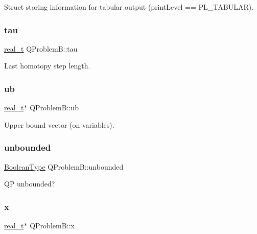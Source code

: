 Struct storing information for tabular output (print\+Level == P\+L\+\_\+\+T\+A\+B\+U\+L\+AR). \mbox{\label{class_q_problem_b_a382545a2e9cf4591bf372c9297cac294}} 
\subsubsection{\texorpdfstring{tau}{tau}}
{\footnotesize\ttfamily \hyperlink{qp_o_a_s_e_s__wrapper_8h_a0d00e2b3dfadee81331bbb39068570c4}{real\+\_\+t} Q\+Problem\+B\+::tau\hspace{0.3cm}{\ttfamily [protected]}}

Last homotopy step length. \mbox{\label{class_q_problem_b_ae7d207471df9894e89e974b252fc341e}} 
\subsubsection{\texorpdfstring{ub}{ub}}
{\footnotesize\ttfamily \hyperlink{qp_o_a_s_e_s__wrapper_8h_a0d00e2b3dfadee81331bbb39068570c4}{real\+\_\+t}$\ast$ Q\+Problem\+B\+::ub\hspace{0.3cm}{\ttfamily [protected]}}

Upper bound vector (on variables). \mbox{\label{class_q_problem_b_a689fdbbb9231d84e6c653da59d069963}} 
\subsubsection{\texorpdfstring{unbounded}{unbounded}}
{\footnotesize\ttfamily \hyperlink{_types_8hpp_a20f82124c82b6f5686a7fce454ef9089}{Boolean\+Type} Q\+Problem\+B\+::unbounded\hspace{0.3cm}{\ttfamily [protected]}}

QP unbounded? \mbox{\label{class_q_problem_b_af5f392cdcebe7abe2fc827929e8cfe3b}} 
\subsubsection{\texorpdfstring{x}{x}}
{\footnotesize\ttfamily \hyperlink{qp_o_a_s_e_s__wrapper_8h_a0d00e2b3dfadee81331bbb39068570c4}{real\+\_\+t}$\ast$ Q\+Problem\+B\+::x\hspace{0.3cm}{\ttfamily [protected]}}

